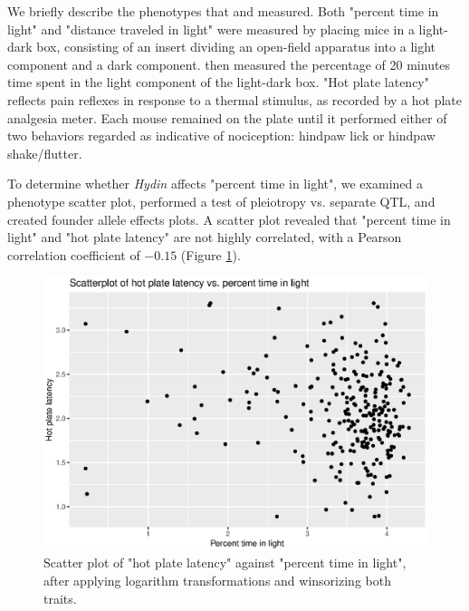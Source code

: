 \documentclass[12pt,twoside, lineno]{gsajnl}
\begin{document}
We briefly describe the phenotypes that \citet{logan2013high} and \citet{recla2014precise} measured. Both "percent time in light" and "distance traveled in light" were measured by placing mice in a light-dark box, consisting of an insert dividing an open-field apparatus into a light component and a dark component. \citet{logan2013high} then measured the percentage of 20 minutes time spent in the light component of the light-dark box. "Hot plate latency" reflects pain reflexes in response to a thermal stimulus, as recorded by a hot plate analgesia meter. Each mouse remained on the plate until it performed either of two behaviors regarded as indicative of nociception: hindpaw lick or hindpaw shake/flutter.




To determine whether \textit{Hydin} affects "percent time in light", we examined a phenotype scatter plot, performed a test of pleiotropy vs. separate QTL, and created founder allele effects plots. A scatter plot revealed that "percent time in light" and "hot plate latency" are not highly correlated, with a Pearson correlation coefficient of $-0.15$ (Figure \ref{fig:scatter}). 

\begin{figure}
\includegraphics[width = \textwidth]{../Rmd/scatter.eps}
\caption{Scatter plot of "hot plate latency" against "percent time in light", after applying logarithm transformations and winsorizing both traits.}
\label{fig:scatter}
\end{figure}
\end{document}
